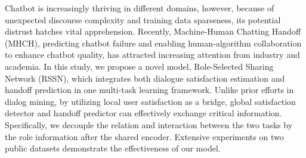 Chatbot is increasingly thriving in different domains, however, because of unexpected discourse complexity and training data sparseness, its potential distrust hatches vital apprehension. Recently, Machine-Human Chatting Handoff (MHCH), predicting chatbot failure and enabling human-algorithm collaboration to enhance chatbot quality, has attracted increasing attention from industry and academia. In this study, we propose a novel model, Role-Selected Sharing Network (RSSN), which integrates both dialogue satisfaction estimation and handoff prediction in one multi-task learning framework. Unlike prior efforts in dialog mining, by utilizing local user satisfaction as a bridge, global satisfaction detector and handoff predictor can effectively exchange critical information. Specifically, we decouple the relation and interaction between the two tasks by the role information after the shared encoder. Extensive experiments on two public datasets demonstrate the effectiveness of our model.
